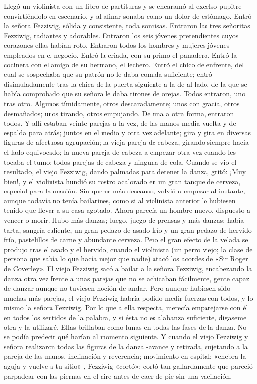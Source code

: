 \documentclass{novela}
\begin{document}
 Llegó un violinista con un libro de partituras y se encaramó al excelso pupitre convirtiéndolo en escenario, y al afinar sonaba como un dolor de estómago. Entró la señora Fezziwig, sólida y consistente, toda sonrisas. Entraron las tres señoritas Fezziwig, radiantes y adorables. Entraron los seis jóvenes pretendientes cuyos corazones ellas habían roto. Entraron todos los hombres y mujeres jóvenes empleados en el negocio. Entró la criada, con su primo el panadero. Entró la cocinera con el amigo de su hermano, el lechero. Entró el chico de enfrente, del cual se sospechaba que su patrón no le daba comida suficiente; entró disimuladamente tras la chica de la puerta siguiente a la de al lado, de la que se había comprobado que su señora le daba tirones de orejas. Todos entraron, uno tras otro. Algunos tímidamente, otros descaradamente; unos con gracia, otros desmañados; unos tirando, otros empujando. De una a otra forma, entraron todos. Y allí estaban veinte parejas a la vez, de las manos media vuelta y de espalda para atrás; juntos en el medio y otra vez adelante; gira y gira en diversas figuras de afectuosa agrupación; la vieja pareja de cabeza, girando siempre hacia el lado equivocado; la nueva pareja de cabeza a empezar otra vez cuando les tocaba el tumo; todos parejas de cabeza y ninguna de cola. Cuando se vio el resultado, el viejo Fezziwig, dando palmadas para detener la danza, gritó: ¡Muy bien!, y el violinista hundió su rostro acalorado en un gran tanque de cerveza, especial para la ocasión. Sin querer más descanso, volvió a empezar al instante, aunque todavía no tenía bailarines, como si al violinista anterior lo hubiesen tenido que llevar a su casa agotado. Ahora parecía un hombre nuevo, dispuesto a vencer o morir.
 Hubo más danzas; luego, juego de prensas y más danzas; había tarta, sangría caliente, un gran pedazo de asado frío y un gran pedazo de hervido frío, pastelillos de carne y abundante cerveza. Pero el gran efecto de la velada se produjo tras el asado y el hervido, cuando el violinista (un perro viejo; la clase de persona que sabía lo que hacía mejor que nadie) atacó los acordes de «Sir Roger de Coverley». El viejo Fezziwig sacó a bailar a la señora Fezziwig, encabezando la danza otra vez frente a unas parejas que no se achicaban fácilmente, gente capaz de danzar aunque no tuviesen noción de andar.
 Pero aunque hubiesen sido muchas más parejas, el viejo Fezziwig habría podido medir fuerzas con todos, y lo mismo la señora Fezziwig. Por lo que a ella respecta, merecía emparejarse con él en todos los sentidos de la palabra, y si ésta no es alabanza suficiente, digaseme otra y la utilizaré. Ellas brillaban como lunas en todas las fases de la danza. No se podía predecir qué harían al momento siguiente. Y cuando el viejo Fezziwig y señora realizaron todas las figuras de la danza -avance y retirada, sujetando a la pareja de las manos, inclinación y reverencia; movimiento en espital; «enebra la aguja y vuelve a tu sitio»-, Fezziwig «cortó»; cortó tan gallardamente que pareció parpadear con las piernas en el aire antes de caer de pie sin una vacilación.
\end{document}
